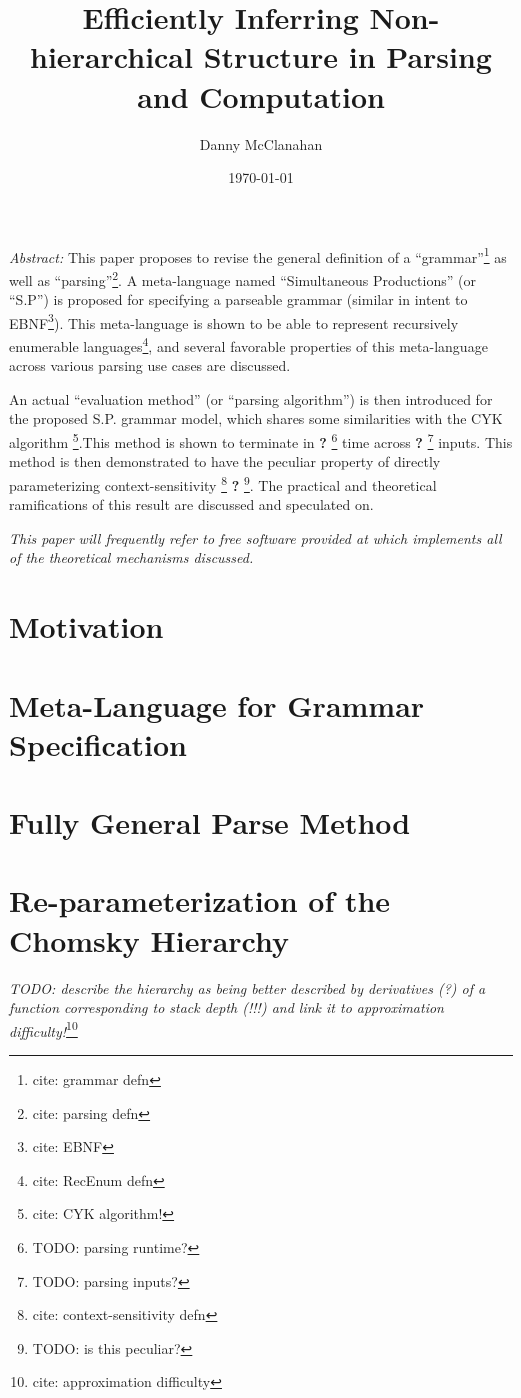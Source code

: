 \documentclass[10pt]{article}
\title{Efficiently Inferring Non-hierarchical Structure in Parsing and Computation}
\date{\today}
\author{Danny McClanahan}
\newcommand{\todocite}[1]{\footnote{cite: #1}}
\newcommand{\todo}[1]{\textbf{?} \footnote{TODO: #1}}
\begin{document}
\maketitle

\textit{Abstract:} This paper proposes to revise the general definition of a ``grammar''\todocite{grammar defn} as well as ``parsing''\todocite{parsing defn}. A meta-language named ``Simultaneous Productions'' (or ``S.P'') is proposed for specifying a parseable grammar (similar in intent to EBNF\todocite{EBNF}). This meta-language is shown to be able to represent recursively enumerable languages\todocite{RecEnum defn}, and several favorable properties of this meta-language across various parsing use cases are discussed.

An actual ``evaluation method'' (or ``parsing algorithm'') is then introduced for the proposed S.P. grammar model, which shares some similarities with the CYK algorithm \todocite{CYK algorithm!}.This method is shown to terminate in \todo{parsing runtime?} time across \todo{parsing inputs?} inputs. This method is then demonstrated to have the peculiar property of directly parameterizing context-sensitivity \todocite{context-sensitivity defn} \todo{is this peculiar?}. The practical and theoretical ramifications of this result are discussed and speculated on.

\textit{This paper will frequently refer to free software provided at \cite{repo-sp} which implements all of the theoretical mechanisms discussed.}

\newpage
\tableofcontents
\newpage

\section{Motivation}
\label{sec:motivation}

\section{Meta-Language for Grammar Specification}
\label{sec:meta-language-for-grammar-specification}

\section{Fully General Parse Method}
\label{sec:fully-general-parse-method}

\section{Re-parameterization of the Chomsky Hierarchy}
\label{sec:re-parameterization-of-the-chomsky-hierarchy}

\textit{TODO: describe the hierarchy as being better described by derivatives (?) of a function corresponding to stack depth (!!!) and link it to approximation difficulty!}\todocite{approximation difficulty}

\printbibliography
\end{document}
